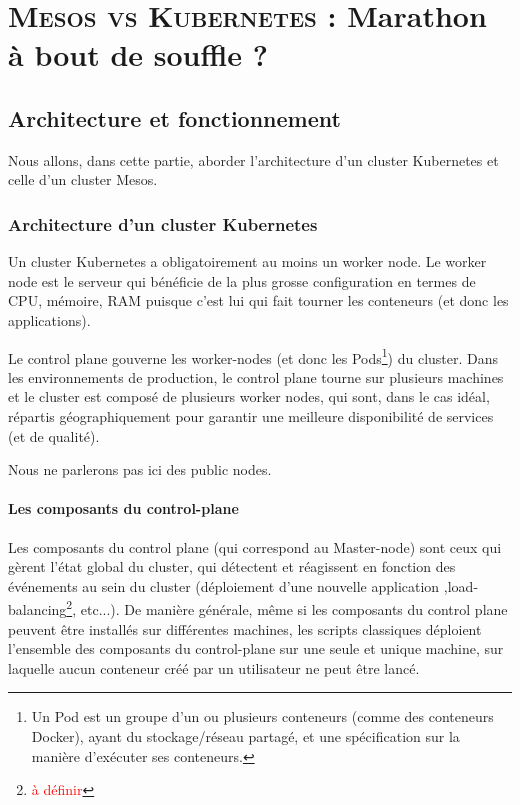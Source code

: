 \documentclass[11pt,fleqn]{book} %
\begin{document}
\part{\color{ocre}\textsc{Mesos vs Kubernetes} : Marathon à bout de souffle ?}
\chapter{Architecture et fonctionnement}
\vspace{-2cm}

Nous allons, dans cette partie, aborder l'architecture d'un cluster Kubernetes et celle d'un cluster Mesos.



\section{Architecture d'un cluster Kubernetes}
Un cluster Kubernetes a obligatoirement au moins un worker node. Le worker node est le serveur qui bénéficie de la plus grosse configuration en termes de CPU, mémoire, RAM puisque c'est lui qui fait tourner les conteneurs (et donc les applications).\newline 

Le control plane gouverne les worker-nodes (et donc les Pods\footnote{Un Pod est un groupe d'un ou plusieurs conteneurs (comme des conteneurs Docker), ayant du stockage/réseau partagé, et une spécification sur la manière d'exécuter ses conteneurs.}) du cluster. Dans les environnements de production, le control plane tourne sur plusieurs machines et le cluster est composé de plusieurs worker nodes, qui sont, dans le cas idéal, répartis géographiquement pour garantir une  meilleure disponibilité de services (et de qualité).\newline

Nous ne parlerons pas ici des public nodes.


\subsection{Les composants du control-plane}
Les composants du control plane (qui correspond au Master-node) sont ceux qui gèrent l'état global du cluster, qui détectent et réagissent en fonction des événements au sein du cluster (déploiement d'une nouvelle application ,load-balancing\footnote{\textcolor{red}{à définir}}, etc...). De manière générale, même si les composants du control plane peuvent être installés sur différentes machines, les scripts classiques déploient l'ensemble des composants du control-plane sur une seule et unique machine, sur laquelle aucun conteneur créé par un utilisateur ne peut être lancé.
\end{document}
